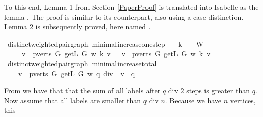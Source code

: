 \begin{isabellebody}
\begin{isamarkuptext}
To this end, Lemma 1 from Section \ref{PaperProof} is translated into Isabelle as the lemma
. The proof is 
similar to its counterpart, also using a case distinction. Lemma 2 is subsequently proved, here
named .%
\end{isamarkuptext}\isamarkuptrue%
\isamarkupfalse%
{\isacharparenleft}\ distinct{\isacharunderscore}weighted{\isacharunderscore}pair{\isacharunderscore}graph{\isacharparenright}\ minimal{\isacharunderscore}increase{\isacharunderscore}one{\isacharunderscore}step{\isacharcolon}\isanewline
\ \ \ {\isachardoublequoteopen}k\ {\isacharplus}\ {}\ {\isasymin}\ W{\isachardoublequoteclose}\isanewline
\ \ \ \isanewline
\ \ \ \ {\isachardoublequoteopen}{\isacharparenleft}{\isasymSum}\ v\ {\isasymin}\ pverts\ G{\isachardot}\ getL\ G\ w\ {\isacharparenleft}k{\isacharplus}{}{\isacharparenright}\ v{\isacharparenright}\ {\isasymge}\ {\isacharparenleft}{\isasymSum}\ v\ {\isasymin}\ pverts\ G{\isachardot}\ getL\ G\ w\ k\ v{\isacharparenright}\ {\isacharplus}\ {}{\isachardoublequoteclose}%
\isadelimproof
%
\endisadelimproof
%
\isatagproof
%
\endisatagproof
{\isafoldproof}%
%
\isadelimproof
%
\endisadelimproof
%
\isadelimproof
%
\endisadelimproof
%
\isatagproof
%
\endisatagproof
{\isafoldproof}%
%
\isadelimproof
\isanewline
%
\endisadelimproof
\isanewline
{}\isamarkupfalse%
{\isacharparenleft}\ distinct{\isacharunderscore}weighted{\isacharunderscore}pair{\isacharunderscore}graph{\isacharparenright}\ minimal{\isacharunderscore}increase{\isacharunderscore}total{\isacharcolon}\isanewline
\ \ \ {\isachardoublequoteopen}{\isacharparenleft}{\isasymSum}\ v\ {\isasymin}\ pverts\ G{\isachardot}\ getL\ G\ w\ {\isacharparenleft}q\ div\ {}{\isacharparenright}\ v{\isacharparenright}\ {\isasymge}\ q{\isachardoublequoteclose}%
\isadelimproof
%
\endisadelimproof
%
\isatagproof
%
\endisatagproof
{\isafoldproof}%
%
\isadelimproof
%
\endisadelimproof
%
\isadelimproof
%
\endisadelimproof
%
\isatagproof
%
\endisatagproof
{\isafoldproof}%
%
\isadelimproof
%
\endisadelimproof
%
\begin{isamarkuptext}%
From  we have that that the sum of all labels after $q$ div $2$ steps is 
greater than $q$. Now assume that all labels are smaller than $q$ div $n$. Because we have $n$ vertices, this

\end{isamarkuptext}
\end{isabellebody}
